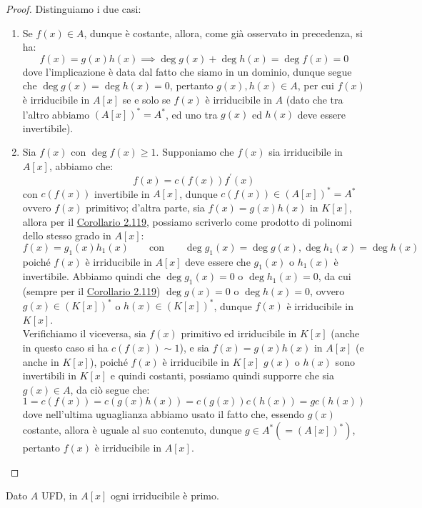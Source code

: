 \documentclass[11pt]{scrartcl}
\begin{document}
\begin{proof}
    Distinguiamo i due casi:
    \begin{enumerate}
        \item Se $f(x) \in A$, dunque è costante, allora, come già osservato in precedenza, si ha:
        \[ f(x) = g(x)h(x) \implies \deg g(x) + \deg h(x) = \deg f(x) = 0
            \]
        dove l'implicazione è data dal fatto che siamo in un dominio, dunque segue che $\deg g(x) = \deg h(x) =  0$, pertanto $g(x),h(x) \in A$,
        per cui $f(x)$ è irriducibile in $A[x]$ se e solo se $f(x)$ è irriducibile in $A$ (dato che tra l'altro abbiamo $(A[x])^* = A^*$, ed uno tra $g(x)$ ed $h(x)$ deve essere invertibile).
        \item Sia $f(x)$ con $\deg f(x) \geq 1$. Supponiamo che $f(x)$ sia irriducibile in $A[x]$, abbiamo che:
        \[ f(x) = c(f(x))f^{\prime}(x)
            \]
        con $c(f(x))$ invertibile in $A[x]$, dunque $c(f(x)) \in (A[x])^* = A^*$ ovvero $f(x)$ primitivo; d'altra parte, sia $f(x) = g(x)h(x)$ in $K[x]$, allora per il
        \hyperref[2.119]{Corollario 2.119}, possiamo scriverlo come prodotto di polinomi dello stesso grado in $A[x]$:
        \[ f(x) = g_1(x)h_1(x) \qquad \text{con} \qquad \deg g_1(x) = \deg g(x), \deg h_1(x) = \deg h(x)
            \]
        poiché $f(x)$ è irriducibile in $A[x]$ deve essere che $g_1(x)$ o $h_1(x)$ è invertibile. Abbiamo quindi che $\deg g_1(x) = 0$ o $\deg h_1(x) = 0$, da cui (sempre per il \hyperref[2.119]{Corollario 2.119})
        $\deg g(x) = 0$ o $\deg h(x) = 0$, ovvero $g(x) \in (K[x])^*$ o $h(x) \in (K[x])^*$, dunque $f(x)$ è irriducibile in $K[x]$. \\
        Verifichiamo il viceversa, sia $f(x)$ primitivo ed irriducibile in $K[x]$ (anche in questo caso si ha $c(f(x)) \sim 1$), e sia $f(x) = g(x)h(x)$ in $A[x]$ (e anche in $K[x]$), poiché $f(x)$ è irriducibile in $K[x]$ 
        $g(x)$ o $h(x)$ sono invertibili in $K[x]$ e quindi costanti, possiamo quindi supporre che sia $g(x) \in A$, da ciò segue che:
        \[ 1 = c(f(x)) = c(g(x)h(x)) = c(g(x))c(h(x)) = g c(h(x))
            \]
        dove nell'ultima uguaglianza abbiamo usato il fatto che, essendo $g(x)$ costante, allora è uguale al suo contenuto, dunque $g \in A^* (= (A[x])^*)$, pertanto $f(x)$ è irriducibile in $A[x]$.
    \end{enumerate}
\end{proof}

\begin{proposition}
    Dato $A$ UFD, in $A[x]$ ogni irriducibile è primo.
\end{proposition}
\end{document}
